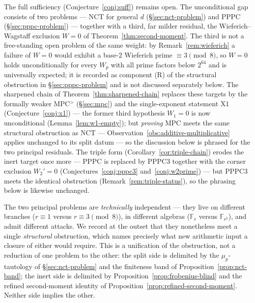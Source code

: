 \documentclass[11pt]{amsart}
\theoremstyle{plain}
\theoremstyle{definition}
\theoremstyle{remark}
\numberwithin{equation}{section}
\newcommand{\F}{\mathbb{F}}
\begin{document}
The full sufficiency (Conjecture~\ref{conj:suff}) remains open. The unconditional gap consists of two problems --- NCT for general $d$ (\S\ref{sec:nct-problem}) and PPPC (\S\ref{sec:pppc-problem}) --- together with a third, far milder residual, the Wieferich--Wagstaff exclusion $W = 0$ of Theorem~\ref{thm:second-moment}. The third is not a free-standing open problem of the same weight: by Remark~\ref{rem:wieferich} a failure of $W = 0$ would exhibit a base-$2$ Wieferich prime $\equiv 3 \pmod 8$, so $W = 0$ holds unconditionally for every $W_p$ with all prime factors below $2^{64}$ \cite{ref:OEISWieferich} and is universally expected; it is recorded as component (R) of the structural obstruction in \S\ref{sec:pppc-problem} and is not discussed separately below. The sharpened chain of Theorem~\ref{thm:sharpened-chain} replaces these targets by the formally weaker MPC$^{>}$ (\S\ref{sec:mpc}) and the single-exponent statement X1 (Conjecture~\ref{conj:x1}) --- the former third hypothesis $W_1 = 0$ is now unconditional (Lemma~\ref{lem:w1-empty}); but \emph{proving} MPC meets the same structural obstruction as NCT --- Observation~\ref{obs:additive-multiplicative} applies unchanged to its split datum --- so the discussion below is phrased for the two principal residuals. The triple form (Corollary~\ref{cor:triple-chain}) erodes the inert target once more --- PPPC is replaced by PPPC3 together with the corner exclusion $W_2' = 0$ (Conjectures~\ref{conj:pppc3} and~\ref{conj:w2prime}) --- but PPPC3 meets the identical obstruction (Remark~\ref{rem:triple-status}), so the phrasing below is likewise unchanged.

The two principal problems are \emph{technically} independent --- they live on different branches ($r \equiv 1$ versus $r \equiv 3 \pmod 8$), in different algebras ($\F_r$ versus $\F_{r^2}$), and admit different attacks. We record at the outset that they nonetheless meet a single \emph{structural} obstruction, which names precisely what new arithmetic input a closure of either would require. This is a unification of the obstruction, not a reduction of one problem to the other: the split side is delimited by the $\mu_p$-tautology of \S\ref{sec:nct-problem} and the finiteness band of Proposition~\ref{prop:nct-band}; the inert side is delimited by Proposition~\ref{prop:frobenius-blind} and the refined second-moment identity of Proposition~\ref{prop:refined-second-moment}. Neither side implies the other.
\end{document}
